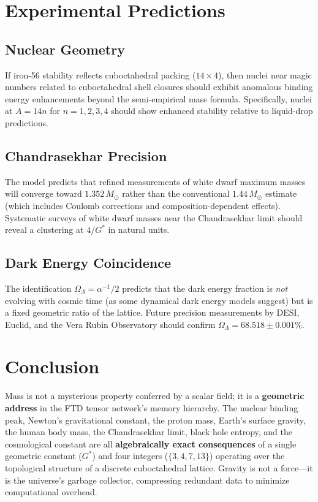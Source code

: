 \documentclass[11pt, letterpaper]{article}
\newcommand{\G}{G^*}
\theoremstyle{definition}
\theoremstyle{remark}
\begin{document}
\section{Experimental Predictions}

\subsection{Nuclear Geometry}
If iron-56 stability reflects cuboctahedral packing ($14 \times 4$), then nuclei near magic numbers related to cuboctahedral shell closures should exhibit anomalous binding energy enhancements beyond the semi-empirical mass formula. Specifically, nuclei at $A = 14n$ for $n = 1, 2, 3, 4$ should show enhanced stability relative to liquid-drop predictions.

\subsection{Chandrasekhar Precision}
The model predicts that refined measurements of white dwarf maximum masses will converge toward $1.352\,M_\odot$ rather than the conventional $1.44\,M_\odot$ estimate (which includes Coulomb corrections and composition-dependent effects). Systematic surveys of white dwarf masses near the Chandrasekhar limit should reveal a clustering at $4/\G$ in natural units.

\subsection{Dark Energy Coincidence}
The identification $\Omega_\Lambda = \alpha^{-1}/2$ predicts that the dark energy fraction is \textit{not} evolving with cosmic time (as some dynamical dark energy models suggest) but is a fixed geometric ratio of the lattice. Future precision measurements by DESI, Euclid, and the Vera Rubin Observatory should confirm $\Omega_\Lambda = 68.518 \pm 0.001\%$.

\section{Conclusion}

Mass is not a mysterious property conferred by a scalar field; it is a \textbf{geometric address} in the FTD tensor network's memory hierarchy. The nuclear binding peak, Newton's gravitational constant, the proton mass, Earth's surface gravity, the human body mass, the Chandrasekhar limit, black hole entropy, and the cosmological constant are all \textbf{algebraically exact consequences} of a single geometric constant ($\G$) and four integers ($\{3, 4, 7, 13\}$) operating over the topological structure of a discrete cuboctahedral lattice. Gravity is not a force---it is the universe's garbage collector, compressing redundant data to minimize computational overhead.
\end{document}
